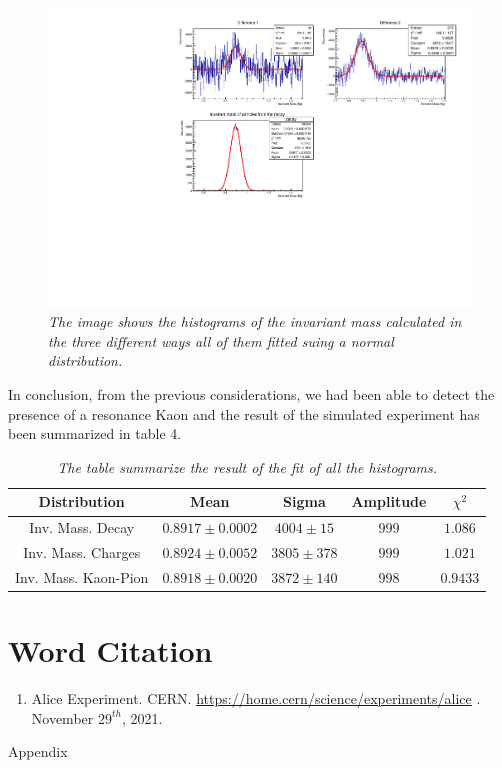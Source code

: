 \documentclass[a4paper, 11pt]{article}
\begin{document}
    \begin{figure}[h!]
      \includegraphics[width=.8\linewidth]{cam.pdf}
      \caption{\label{f3}\textit{The image shows the histograms of the invariant mass calculated in the three different ways all of them fitted suing a normal distribution.}}
    \end{figure}
    In conclusion, from the previous considerations, we had been able to detect the presence of a resonance Kaon and the result of the simulated experiment has been summarized in table 4.
    \begin{table}[h!]
      \centering
      \begin{tabular}{ c | c c c c }
        \hline
        Distribution & Mean & Sigma & Amplitude & $\chi^2$ \\
        \hline
        Inv. Mass. Decay & $0.8917\pm0.0002$ & $4004\pm15$ & $999$ & $1.086$\\
        Inv. Mass. Charges & $0.8924\pm0.0052$ & $3805\pm378$ & $999$ & $1.021$\\
        Inv. Mass. Kaon-Pion & $0.8918\pm0.0020$ & $3872\pm140$ & $998$ & $0.9433$ \\
        \hline
      \end{tabular}
      \caption{ \label{Table 4}
      \textit{The table summarize the result of the fit of all the histograms.}
      }
    \end{table}

    \section* {Word Citation}
    \begin{enumerate}
      \item{Alice Experiment. CERN. \url{https://home.cern/science/experiments/alice} . November $29^{th}$, 2021.}
    \end{enumerate}
    \newpage
    \begin{center}
      \Huge Appendix
    \end{center}
\end{document}
